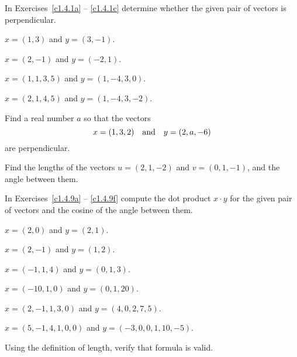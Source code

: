 \documentclass{ximera}
\begin{document}
\noindent In Exercises~\ref{c1.4.1a} -- \ref{c1.4.1c} determine
whether the given pair of vectors is perpendicular.
\begin{exercise} \label{c1.4.1a}
$x=(1,3)$ and $y=(3,-1)$.
\end{exercise}
\begin{exercise} \label{c1.4.1b}
$x=(2,-1)$ and $y=(-2,1)$.
\end{exercise}
\begin{exercise} \label{c1.4.1bb}
$x=(1,1,3,5)$ and $y=(1,-4,3,0)$.
\end{exercise}
\begin{exercise} \label{c1.4.1c}
$x=(2,1,4,5)$ and $y=(1,-4,3,-2)$.
\end{exercise}


\begin{exercise} \label{c1.4.2}
Find a real number $a$ so that the vectors
\[
x = (1,3,2) \quad\mbox{and}\quad y = (2,a,-6)
\]
are perpendicular.
\end{exercise}

\begin{exercise} \label{c1.4.3}
Find the lengths of the vectors $u=(2,1,-2)$ and $v=(0,1,-1)$,
and the angle between them.
\end{exercise}

\noindent In Exercises~\ref{c1.4.9a} -- \ref{c1.4.9f}
compute the dot product $x\cdot y$ for the given pair of vectors and 
the cosine of the angle between them.
\begin{exercise} \label{c1.4.9a}
$x=(2,0)$ and $y=(2,1)$.
\end{exercise}
\begin{exercise} \label{c1.4.9b}
$x=(2,-1)$ and $y=(1,2)$.
\end{exercise}
\begin{exercise} \label{c1.4.9c}
$x=(-1,1,4)$ and $y=(0,1,3)$.
\end{exercise}
\begin{exercise} \label{c1.4.9d}
$x=(-10,1,0)$ and $y=(0,1,20)$.
\end{exercise}
\begin{exercise} \label{c1.4.9e}
$x=(2,-1,1,3,0)$ and $y=(4,0,2,7,5)$.
\end{exercise}
\begin{exercise} \label{c1.4.9f}
$x=(5,-1,4,1,0,0)$ and $y=(-3,0,0,1,10,-5)$.
\end{exercise}

\begin{exercise}  \label{c1.4.9A}
Using the definition of length, verify that formula  
is valid.
\end{exercise}
\end{document}
